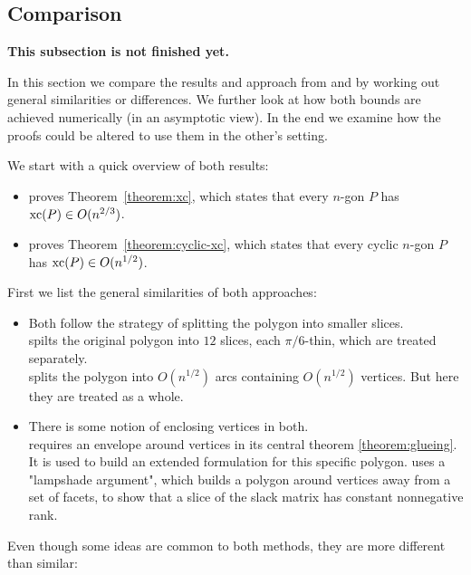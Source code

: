 \subsection{Comparison}
\textbf{This subsection is not finished yet.}

In this section we compare the results and approach from \cite{shitov2020sublinear} and \cite{kwan2020extension} by working out general similarities or differences. We further look at how both bounds are achieved numerically (in an asymptotic view). In the end we examine how the proofs could be altered to use them in the other's setting.

We start with a quick overview of both results:

\begin{itemize}
  \item \cite{shitov2020sublinear} proves Theorem~\ref{theorem:xc}, which states that every $n$-gon $P$ has $\operatorname{xc}(P) \in O(n^{2/3})$.
  \item \cite{kwan2020extension} proves Theorem~\ref{theorem:cyclic-xc}, which states that every cyclic $n$-gon $P$ has $\operatorname{xc}(P) \in O(n^{1/2})$.
\end{itemize}

First we list the general similarities of both approaches:

\begin{itemize}
  \item Both follow the strategy of splitting the polygon into smaller slices.\\
  \cite{shitov2020sublinear} spilts the original polygon into $12$ slices, each $\pi/6$-thin, which are treated separately.\\
  \cite{kwan2020extension} splits the polygon into $O(n^{1/2})$ arcs containing $O(n^{1/2})$ vertices. But here they are treated as a whole.

  \item There is some notion of enclosing vertices in both.\\
  \cite{shitov2020sublinear} requires an envelope around vertices in its central theorem \ref{theorem:glueing}. It is used to build an extended formulation for this specific polygon.
  \cite{kwan2020extension} uses a "lampshade argument", which builds a polygon around vertices away from a set of facets, to show that a slice of the slack matrix has constant nonnegative rank.
\end{itemize}

Even though some ideas are common to both methods, they are more different than similar:

